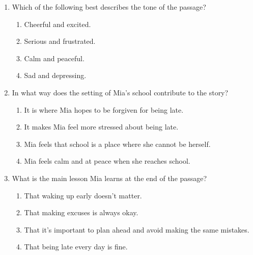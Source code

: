 \documentclass[12pt]{article}
\begin{document}
\begin{enumerate}
    \item Which of the following best describes the tone of the passage?
    \begin{enumerate}[label=\Alph*.]
        \item Cheerful and excited.
        \item Serious and frustrated.
        \item Calm and peaceful.
        \item Sad and depressing.
    \end{enumerate}
    \vspace{0.5cm}

    \item In what way does the setting of Mia's school contribute to the story?
    \begin{enumerate}[label=\Alph*.]
        \item It is where Mia hopes to be forgiven for being late.
        \item It makes Mia feel more stressed about being late.
        \item Mia feels that school is a place where she cannot be herself.
        \item Mia feels calm and at peace when she reaches school.
    \end{enumerate}
    \vspace{0.5cm}

    \item What is the main lesson Mia learns at the end of the passage?
    \begin{enumerate}[label=\Alph*.]
        \item That waking up early doesn’t matter.
        \item That making excuses is always okay.
        \item That it’s important to plan ahead and avoid making the same mistakes.
        \item That being late every day is fine.
    \end{enumerate}
\end{enumerate}
\end{document}
